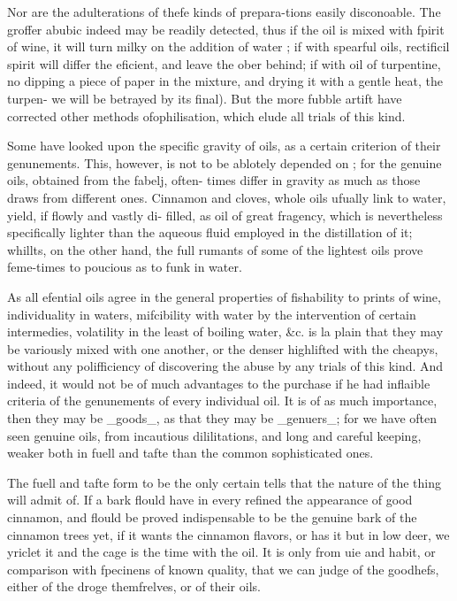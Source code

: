 \documentclass{article}
\begin{document}
Nor are the adulterations of thefe kinds of prepara-tions easily disconoable. The groffer abubic indeed may be readily detected, thus if the oil is mixed with fpirit of wine, it will turn milky on the addition of water ; if with spearful oils, rectificil spirit will differ the eficient, and leave the ober behind; if with oil of turpentine, no dipping a piece of paper in the mixture, and drying it with a gentle heat, the turpen- we will be betrayed by its final). But the more fubble artift have corrected other methods ofophilisation, which elude all trials of this kind.

Some have looked upon the specific gravity of oils, as a certain criterion of their genunements. This, however, is not to be ablotely depended on ; for the genuine oils, obtained from the fabelj, often- times differ in gravity as much as those draws from different ones. Cinnamon and cloves, whole oils ufually link to water, yield, if flowly and vastly di- filled, as oil of great fragency, which is nevertheless specifically lighter than the aqueous fluid employed in the distillation of it; whillts, on the other hand, the full rumants of some of the lightest oils prove feme-times to poucious as to funk in water.

As all efential oils agree in the general properties of fishability to prints of wine, individuality in waters, mifcibility with water by the intervention of certain intermedies, volatility in the least of boiling water, \&c. is la plain that they may be variously mixed with one another, or the denser highlifted with the cheapys, without any polifficiency of discovering the abuse by any trials of this kind. And indeed, it would not be of much advantages to the purchase if he had inflaible criteria of the genunements of every individual oil. It is of as much importance, then they may be \_goods\_, as that they may be \_genuers\_; for we have often seen genuine oils, from incautious dililitations, and long and careful keeping, weaker both in fuell and tafte than the common sophisticated ones.

The fuell and tafte form to be the only certain tells that the nature of the thing will admit of. If a bark flould have in every refined the appearance of good cinnamon, and flould be proved indispensable to be the genuine bark of the cinnamon trees yet, if it wants the cinnamon flavors, or has it but in low deer, we yriclet it and the cage is the time with the oil. It is only from uie and habit, or comparison with fpecinens of known quality, that we can judge of the goodhefs, either of the droge themfrelves, or of their oils.
\end{document}
